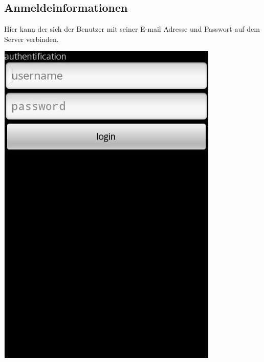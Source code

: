 \documentclass[a4paper,10pt,titlepage]{article}
\begin{document}
\subsection{Anmeldeinformationen}
Hier kann der sich der Benutzer mit seiner E-mail Adresse und Passwort auf dem Server verbinden.
\begin {center}
\includegraphics[scale=0.35]{media/android/login.jpg}
\end {center}
\end{document}
